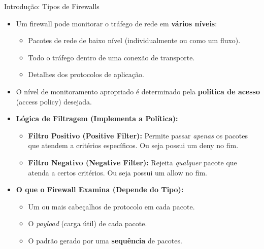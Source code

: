 \begin{frame}{Introdução: Tipos de Firewalls}
    \begin{itemize}
        \item Um firewall pode monitorar o tráfego de rede em \textbf{vários níveis}:
              \begin{itemize}
                  \item Pacotes de rede de baixo nível (individualmente ou como um fluxo).
                  \item Todo o tráfego dentro de uma conexão de transporte.
                  \item Detalhes dos protocolos de aplicação.
              \end{itemize}

        \item O nível de monitoramento apropriado é determinado pela \textbf{política de acesso} (access policy) desejada.

        \item \textbf{Lógica de Filtragem (Implementa a Política):}
              \begin{itemize}
                  \item \textbf{Filtro Positivo (Positive Filter):} Permite passar \textit{apenas} os pacotes que atendem a critérios específicos. Ou seja possui um deny no fim.
                  \item \textbf{Filtro Negativo (Negative Filter):} Rejeita \textit{qualquer} pacote que atenda a certos critérios. Ou seja possui um allow no fim.
              \end{itemize}

        \item \textbf{O que o Firewall Examina (Depende do Tipo):}
              \begin{itemize}
                  \item Um ou mais cabeçalhos de protocolo em cada pacote.
                  \item O \textit{payload} (carga útil) de cada pacote.
                  \item O padrão gerado por uma \textbf{sequência} de pacotes.
              \end{itemize}


    \end{itemize}
\end{frame}

